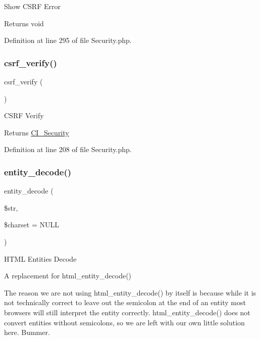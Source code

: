 Show C\+S\+RF Error

\begin{DoxyReturn}{Returns}
void 
\end{DoxyReturn}


Definition at line 295 of file Security.\+php.

\mbox{\label{class_c_i___security_a03c037268db0c2e6221b65a736eaee07}} 
\subsubsection{\texorpdfstring{csrf\_verify()}{csrf\_verify()}}
{\footnotesize\ttfamily csrf\+\_\+verify (\begin{DoxyParamCaption}{ }\end{DoxyParamCaption})}

C\+S\+RF Verify

\begin{DoxyReturn}{Returns}
\mbox{\hyperlink{class_c_i___security}{C\+I\+\_\+\+Security}} 
\end{DoxyReturn}


Definition at line 208 of file Security.\+php.

\mbox{\label{class_c_i___security_a8bec9918f4d35c9e6340e1dc6a32ba14}} 
\subsubsection{\texorpdfstring{entity\_decode()}{entity\_decode()}}
{\footnotesize\ttfamily entity\+\_\+decode (\begin{DoxyParamCaption}\item[{}]{\$str,  }\item[{}]{\$charset = {\ttfamily NULL} }\end{DoxyParamCaption})}

H\+T\+ML Entities Decode

A replacement for html\+\_\+entity\+\_\+decode()

The reason we are not using html\+\_\+entity\+\_\+decode() by itself is because while it is not technically correct to leave out the semicolon at the end of an entity most browsers will still interpret the entity correctly. html\+\_\+entity\+\_\+decode() does not convert entities without semicolons, so we are left with our own little solution here. Bummer.

